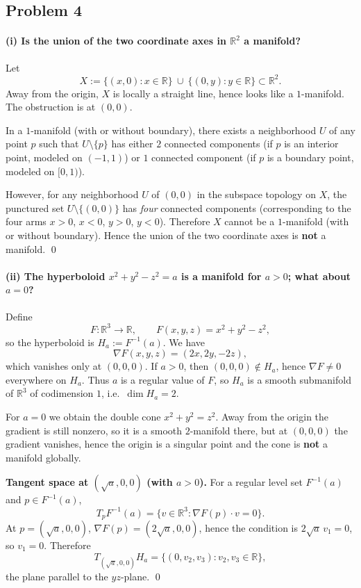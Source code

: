 \documentclass[12pt,a4paper]{article}
\theoremstyle{plain}
\theoremstyle{definition}      %
\begin{document}
\subsection*{Problem 4}
\paragraph{(i) Is the union of the two coordinate axes in $\mathbb{R}^2$ a manifold?}
Let
\[
X:=\{(x,0):x\in\mathbb{R}\}\ \cup\ \{(0,y):y\in\mathbb{R}\}\subset\mathbb{R}^2.
\]
Away from the origin, $X$ is locally a straight line, hence looks like a $1$-manifold.
The obstruction is at $(0,0)$.

In a $1$-manifold (with or without boundary), there exists a neighborhood $U$ of any point $p$
such that $U\setminus\{p\}$ has either $2$ connected components (if $p$ is an interior point,
modeled on $(-1,1)$) or $1$ connected component (if $p$ is a boundary point, modeled on $[0,1)$).

However, for any neighborhood $U$ of $(0,0)$ in the subspace topology on $X$, the punctured set
$U\setminus\{(0,0)\}$ has \emph{four} connected components (corresponding to the four arms
$x>0$, $x<0$, $y>0$, $y<0$). Therefore $X$ cannot be a $1$-manifold (with or without boundary).
Hence the union of the two coordinate axes is \textbf{not} a manifold.
\qed

\paragraph{(ii) The hyperboloid $x^2+y^2-z^2=a$ is a manifold for $a>0$; what about $a=0$?}
Define
\[
F:\mathbb{R}^3\to\mathbb{R},\qquad F(x,y,z)=x^2+y^2-z^2,
\]
so the hyperboloid is $H_a:=F^{-1}(a)$.
We have
\[
\nabla F(x,y,z)=(2x,2y,-2z),
\]
which vanishes only at $(0,0,0)$. If $a>0$, then $(0,0,0)\notin H_a$, hence $\nabla F\neq 0$
everywhere on $H_a$. Thus $a$ is a regular value of $F$, so $H_a$ is a smooth submanifold of
$\mathbb{R}^3$ of codimension $1$, i.e.\ $\dim H_a=2$.

For $a=0$ we obtain the double cone $x^2+y^2=z^2$. Away from the origin the gradient is still
nonzero, so it is a smooth $2$-manifold there, but at $(0,0,0)$ the gradient vanishes, hence the
origin is a singular point and the cone is \textbf{not} a manifold globally.

\medskip
\noindent\textbf{Tangent space at $(\sqrt a,0,0)$ (with $a>0$).}
For a regular level set $F^{-1}(a)$ and $p\in F^{-1}(a)$,
\[
T_pF^{-1}(a)=\{v\in\mathbb{R}^3:\nabla F(p)\cdot v=0\}.
\]
At $p=(\sqrt a,0,0)$, $\nabla F(p)=(2\sqrt a,0,0)$, hence the condition is $2\sqrt a\,v_1=0$,
so $v_1=0$. Therefore
\[
T_{(\sqrt a,0,0)}H_a=\{(0,v_2,v_3):v_2,v_3\in\mathbb{R}\},
\]
the plane parallel to the $yz$-plane.
\qed
\end{document}
